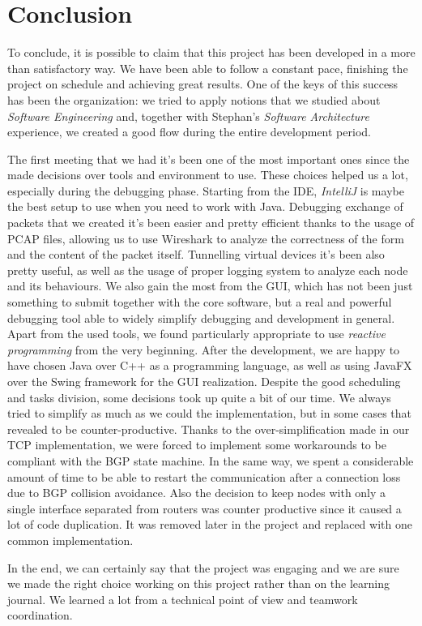 \chapter{Conclusion}
To conclude, it is possible to claim that this project has been developed in a more than satisfactory way.
We have been able to follow a constant pace, finishing the project on schedule and achieving great results.
One of the keys of this success has been the organization: we tried to apply notions that we studied about \textit{Software Engineering} and, together with Stephan's \textit{Software Architecture} experience, we created a good flow during the entire development period.

The first meeting that we had it's been one of the most important ones since the made decisions over tools and environment to use. These choices helped us a lot, especially during the debugging phase. Starting from the IDE, \textit{IntelliJ} is maybe the best setup to use when you need to work with Java. Debugging exchange of packets that we created it's been easier and pretty efficient thanks to the usage of PCAP files, allowing us to use Wireshark to analyze the correctness of the form and the content of the packet itself.
Tunnelling virtual devices it's been also pretty useful, as well as the usage of proper logging system to analyze each node and its behaviours. We also gain the most from the GUI, which has not been just something to submit together with the core software, but a real and powerful debugging tool able to widely simplify debugging and development in general.
Apart from the used tools, we found particularly appropriate to use \textit{reactive programming} from the very beginning. After the development, we are happy to have chosen Java over C++ as a programming language, as well as using JavaFX over the Swing framework for the GUI realization.
Despite the good scheduling and tasks division, some decisions took up quite a bit of our time. We always tried to simplify as much as we could the implementation, but in some cases that revealed to be counter-productive. Thanks to the over-simplification made in our TCP implementation, we were forced to implement some workarounds to be compliant with the BGP state machine. In the same way, we spent a considerable amount of time to be able to restart the communication after a connection loss due to BGP collision avoidance. Also the decision to keep nodes with only a single interface separated from routers was counter productive since it caused a lot of code duplication. It was removed later in the project and replaced with one common implementation.

In the end, we can certainly say that the project was engaging and we are sure we made the right choice working on this project rather than on the learning journal. We learned a lot from a technical point of view and teamwork coordination.
